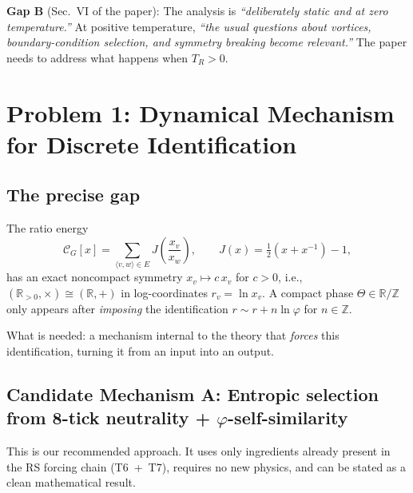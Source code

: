 \documentclass[11pt]{article}
\theoremstyle{definition}
\newcommand{\Jcost}{J}
\newcommand{\TR}{{T_R}}
\newcommand{\phig}{\varphi}
\newcommand{\Ctotal}{\mathcal{C}}
\begin{document}
\medskip\noindent
\textbf{Gap B} (Sec.~VI of the paper): The analysis is \emph{``deliberately static and at zero temperature.''} At positive temperature, \emph{``the usual questions about vortices, boundary-condition selection, and symmetry breaking become relevant.''} The paper needs to address what happens when $\TR > 0$.


\section{Problem 1: Dynamical Mechanism for Discrete Identification}
\label{sec:prob1}

\subsection{The precise gap}

The ratio energy
\begin{equation}
\Ctotal_G[x] = \sum_{\langle v,w\rangle \in E} \Jcost\!\left(\frac{x_v}{x_w}\right), \qquad \Jcost(x) = \tfrac{1}{2}(x + x^{-1}) - 1,
\label{eq:ratio-energy}
\end{equation}
has an exact noncompact symmetry $x_v \mapsto c\,x_v$ for $c > 0$, i.e., $({\mathbb{R}_{>0}}, \times) \cong (\mathbb{R}, +)$ in log-coordinates $r_v = \ln x_v$. A compact phase $\Theta \in \mathbb{R}/\mathbb{Z}$ only appears after \emph{imposing} the identification $r \sim r + n \ln\phig$ for $n \in \mathbb{Z}$.

What is needed: a mechanism internal to the theory that \emph{forces} this identification, turning it from an input into an output.

\subsection{Candidate Mechanism A: Entropic selection from 8-tick neutrality + $\phig$-self-similarity}
\label{sec:mechA}

This is our recommended approach. It uses only ingredients already present in the RS forcing chain (T6~+~T7), requires no new physics, and can be stated as a clean mathematical result.
\end{document}
